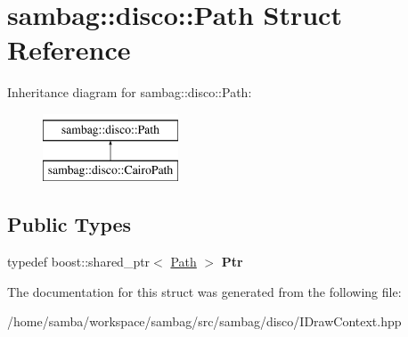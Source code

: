 \hypertarget{structsambag_1_1disco_1_1_path}{
\section{sambag::disco::Path Struct Reference}
\label{structsambag_1_1disco_1_1_path}
}
Inheritance diagram for sambag::disco::Path:\begin{figure}[H]
\begin{center}
\leavevmode
\includegraphics[height=2.000000cm]{structsambag_1_1disco_1_1_path}
\end{center}
\end{figure}
\subsection*{Public Types}
\begin{DoxyCompactItemize}
\item 
\hypertarget{structsambag_1_1disco_1_1_path_af11e0e5de8630a092da4a2d1d7f10c24}{
typedef boost::shared\_\-ptr$<$ \hyperlink{structsambag_1_1disco_1_1_path}{Path} $>$ {\bfseries Ptr}}
\label{structsambag_1_1disco_1_1_path_af11e0e5de8630a092da4a2d1d7f10c24}

\end{DoxyCompactItemize}


The documentation for this struct was generated from the following file:\begin{DoxyCompactItemize}
\item 
/home/samba/workspace/sambag/src/sambag/disco/IDrawContext.hpp\end{DoxyCompactItemize}
